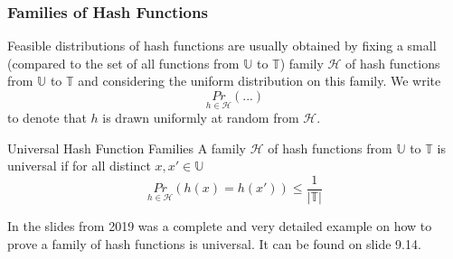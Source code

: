 \documentclass[english]{panikzettel}
\begin{document}
\subsubsection{Families of Hash Functions}
Feasible distributions of hash functions are usually obtained by fixing a small (compared to the set of all functions from $\mathbb{U}$ to $\mathbb{T}$) family $\mathcal{H}$ of hash functions from $\mathbb{U}$ to $\mathbb{T}$ and considering the uniform distribution on
this family. We write
\[
\underset{h\in\mathcal{H}}{Pr}(...)
\]
to denote that $h$ is drawn uniformly at random from $\mathcal{H}$.

\begin{defi}{Universal Hash Function Families}
A family $\mathcal{H}$ of hash functions from $\mathbb{U}$ to $\mathbb{T}$ is universal if for all distinct $x,x'\in \mathbb{U}$
\[
\underset{h\in\mathcal{H}}{Pr}(h(x)=h(x'))\leq \frac{1}{|\mathbb{T}|}
\]
\end{defi}

In the slides from 2019 was a complete and very detailed example on how to prove a family of hash functions is universal. It can be found on slide 9.14.
\end{document}

